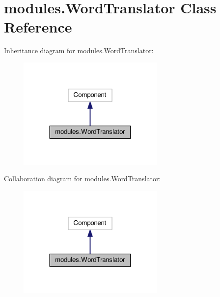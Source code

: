 \hypertarget{classmodules_1_1WordTranslator}{}\section{modules.\+Word\+Translator Class Reference}
\label{classmodules_1_1WordTranslator}


Inheritance diagram for modules.\+Word\+Translator\+:
\nopagebreak
\begin{figure}[H]
\begin{center}
\leavevmode
\includegraphics[width=203pt]{classmodules_1_1WordTranslator__inherit__graph}
\end{center}
\end{figure}


Collaboration diagram for modules.\+Word\+Translator\+:
\nopagebreak
\begin{figure}[H]
\begin{center}
\leavevmode
\includegraphics[width=203pt]{classmodules_1_1WordTranslator__coll__graph}
\end{center}
\end{figure}
